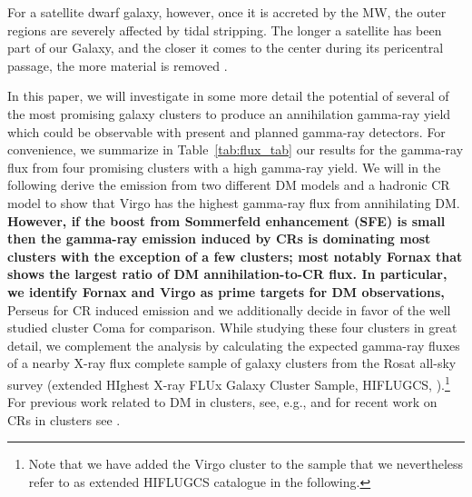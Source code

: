 \documentclass[10pt,aps,pra,reprint,amsmath,amsfonts,amssymb,showpacs,nofootinbib,floatfix]{revtex4-1}
\def\C#1{{\bf #1}}
\begin{document}
For a satellite dwarf galaxy, however, once it is accreted by the MW,
the outer regions are severely affected by tidal stripping. The longer
a satellite has been part of our Galaxy, and the closer it comes to
the center during its pericentral passage, the more material is
removed \cite{2004MNRAS.355..819G}.

In this paper, we will investigate in some more detail the potential
of several of the most promising galaxy clusters to produce an
annihilation gamma-ray yield which could be observable with present
and planned gamma-ray detectors. For convenience, we summarize in
Table~\ref{tab:flux_tab} our results for the gamma-ray flux from four
promising clusters with a high gamma-ray yield. We will in the
following derive the emission from two different DM models and a
hadronic CR model to show that Virgo has the highest gamma-ray flux
from annihilating DM. \C{However, if the boost from Sommerfeld
  enhancement (SFE) is small then the gamma-ray emission induced by
  CRs is dominating most clusters with the exception of a few
  clusters; most notably Fornax that shows the largest ratio of DM
  annihilation-to-CR flux. In particular, we identify Fornax and Virgo
  as prime targets for DM observations,} Perseus for CR induced
emission and we additionally decide in favor of the well studied
cluster Coma for comparison. While studying these four clusters in
great detail, we complement the analysis by calculating the expected
gamma-ray fluxes of a nearby X-ray flux complete sample of galaxy
clusters from the Rosat all-sky survey (extended HIghest X-ray FLUx
Galaxy Cluster Sample, HIFLUGCS,
\citealt{2002ApJ...567..716R,2007A&A...466..805C}).\footnote{Note that
  we have added the Virgo cluster to the sample that we nevertheless
  refer to as extended HIFLUGCS catalogue in the following.} For
previous work related to DM in clusters, see, e.g.,
\cite{2006A&A...455...21C,2009PhRvD..80b3005J,2011arXiv1104.3530S,2011ApJ...726L...6C,2010JCAP...05..025A}
and for recent work on CRs in clusters see
\cite{2010MNRAS.409..449P,2011MNRAS.410..127B,2008MNRAS.385.1211P,2009JCAP...08..002K,2010MNRAS.407.1565D}.
\end{document}
